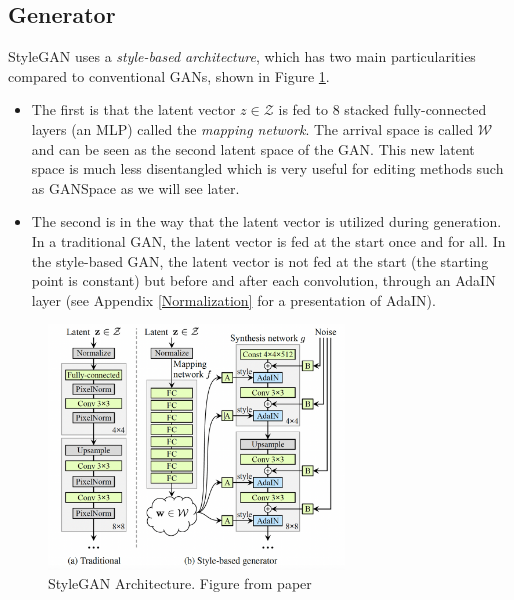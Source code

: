 \documentclass[a4paper]{article}
\begin{document}
\subsection{Generator}


StyleGAN uses a \emph{style-based architecture}, which has two main particularities compared to conventional GANs, shown in Figure \ref{styleganarch}.

\begin{itemize}
    \item The first is that the latent vector $z \in \mathcal{Z}$ is fed to 8 stacked fully-connected layers (an MLP) called the \textit{mapping network}. The arrival space is called $\mathcal{W}$ and can be seen as the second latent space of the GAN. This new latent space is much less disentangled which is very useful for editing methods such as GANSpace as we will see later.
    \item The second is in the way that the latent vector is utilized during generation. 
    \\In a traditional GAN, the latent vector is fed at the start once and for all. In the style-based GAN, the latent vector is not fed at the start (the starting point is constant) but before and after each convolution, through an AdaIN layer (see Appendix \ref{Normalization} for a presentation of AdaIN).
\end{itemize}

\begin{figure}
    \centering
    \includegraphics[width=0.7\textwidth]{imagesfrompapers/StyleGAN1arch.png} %
    \caption{StyleGAN Architecture. Figure from paper \cite{karras2019stylebased}}
    \label{styleganarch}
\end{figure}
\end{document}
